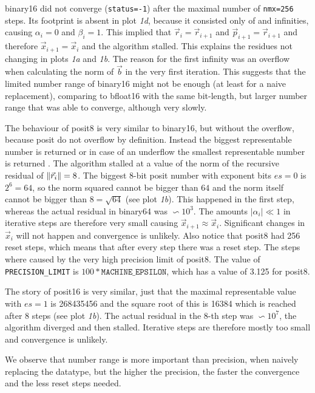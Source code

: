 \documentclass{article}
\theoremstyle{plain} %
\theoremstyle{convention} %
\theoremstyle{remark} %
\def\code#1{\texttt{#1}}
\numberwithin{equation}{section}
\begin{document}
\gls{binary16} did not converge (\code{status=-1}) after the maximal number of \code{nmx=256} steps. Its footprint is absent in plot \textit{1d}, because it consisted only of  and infinities, causing $\alpha_i = 0$ and $\beta_i = 1$. This implied that $\vec{r}_i = \vec{r}_{i+1}$ and $\vec{p}_{i+1} = \vec{r}_{i+1}$ and therefore $\vec{x}_{i+1} = \vec{x}_{i}$ and the algorithm stalled. This explains the residues not changing in plots \textit{1a} and \textit{1b}. The reason for the first infinity was an overflow when calculating the norm of $\vec{b}$ in the very first iteration. This suggests that the limited number range of \gls{binary16} might not be enough (at least for a naive replacement), comparing to \gls{bfloat16} with the same bit-length, but larger number range that was able to converge, although very slowly.

The behaviour of \gls{posit8} is very similar to \gls{binary16}, but without the overflow, because posit do not overflow by definition. Instead the biggest representable number is returned or in case of an underflow the smallest representable number is returned \cite{posit2018standard}. The algorithm stalled at a value of the norm of the recursive residual of $\norm{\vec{r}_i} = 8$. The biggest \num{8}-bit posit number with exponent bits $es=0$ is $2^6 = 64$, so the norm squared cannot be bigger than $64$ and the norm itself cannot be bigger than $8 = \sqrt{64}$ (see plot \textit{1b}). This happened in the first step, whereas the actual residual in \gls{binary64} was $\backsim 10^3$. The amounts $|\alpha_i| \ll 1$ in iterative steps are therefore very small causing $\vec{x}_{i+1} \approx \vec{x}_i$. Significant changes in $\vec{x}_i$ will not happen and convergence is unlikely. Also notice that \gls{posit8} had \num{256} reset steps, which means that after every step there was a reset step. The steps where caused by the very high precision limit of \gls{posit8}. The value of \code{PRECISION\_LIMIT} is $100*\code{MACHINE\_EPSILON}$, which has a value of \num{3.125} for \gls{posit8}.

The story of \gls{posit16} is very similar, just that the maximal representable value with $es=1$ is \num{268435456} and the square root of this is \num{16384} which is reached after $8$ steps (see plot \textit{1b}). The actual residual in the $8$-th step was $\backsim 10^7$, the algorithm diverged and then stalled. Iterative steps are therefore mostly too small and convergence is unlikely.

We observe that number range is more important than precision, when naively replacing the datatype, but the higher the precision, the faster the convergence and the less reset steps needed.
\end{document}
